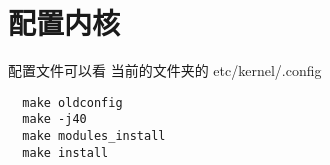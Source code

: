 \chapter{配置内核}
配置文件可以看 当前的文件夹的 etc/kernel/.config

\begin{lstlisting}
  make oldconfig
  make -j40
  make modules_install
  make install
  
\end{lstlisting}

